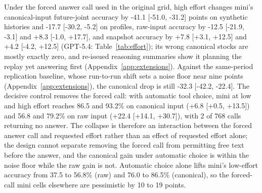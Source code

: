 Under the forced answer call used in the original grid, high effort changes mini's canonical-input future-joint accuracy by -41.1 [-51.0, -31.2] points on synthetic histories and -17.7 [-30.2, -5.2] on profiles, raw-input accuracy by -12.5 [-21.9, -3.1] and +8.3 [-1.0, +17.7], and snapshot accuracy by +7.8 [+3.1, +12.5] and +4.2 [-4.2, +12.5] (GPT-5.4: Table~\ref{tab:effort}); its wrong canonical stocks are mostly exactly zero, and re-issued reasoning summaries show it planning the replay yet answering first (Appendix~\ref{app:extensions}). Against the same-period replication baseline, whose run-to-run shift sets a noise floor near nine points (Appendix~\ref{app:extensions}), the canonical drop is still -32.3 [-42.2, -22.4]. The decisive control removes the forced call: with automatic tool choice, mini at low and high effort reaches 86.5 and 93.2\% on canonical input (+6.8 [+0.5, +13.5]) and 56.8 and 79.2\% on raw input (+22.4 [+14.1, +30.7]), with 2 of 768 calls returning no answer. The collapse is therefore an interaction between the forced answer call and requested effort rather than an effect of requested effort alone; the design cannot separate removing the forced call from permitting free text before the answer, and the canonical gain under automatic choice is within the noise floor while the raw gain is not. Automatic choice alone lifts mini's low-effort accuracy from 37.5 to 56.8\% (raw) and 76.0 to 86.5\% (canonical), so the forced-call mini cells elsewhere are pessimistic by 10 to 19 points.
